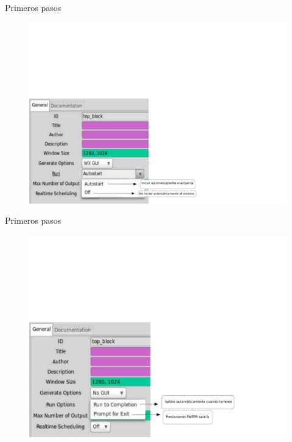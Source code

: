\begin{frame}{Primeros pasos}
\begin{figure}[H]

\centering
\includegraphics[width=\textwidth]{lab1/pdf/lab1_6.pdf}
\end{figure}
\end{frame}

\begin{frame}{Primeros pasos}
\begin{figure}[H]
\centering
\includegraphics[width=\textwidth]{lab1/pdf/lab1_7.pdf}
\end{figure}
\end{frame}

